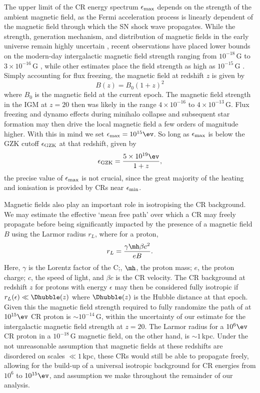 The upper limit of the CR energy spectrum $\epsilon_{\rm max}$ depends on the strength of the ambient magnetic field, as the Fermi acceleration process is linearly dependent of the magnetic field through which the SN shock wave propagates. While the strength, generation mechanism, and distribution of magnetic fields in the early universe remain highly uncertain \citep{DurrerNeronov2013}, recent observations have placed lower bounds on the modern-day intergalactic magnetic field strength ranging from $10^{-18}\,$G \citep{Dermeretal2011} to $3\times10^{-16}\,$G \citep{NeronovVovk2010}, while other estimates place the field strength as high as $10^{-15}\,$G \citep{AndroKusenko2010}.  Simply accounting for flux freezing, the magnetic field at redshift $z$ is given by
\begin{equation}
B(z) = B_0 (1+z)^2
\end{equation}
where $B_0$ is the magnetic field at the current epoch. The magnetic field strength in the IGM at $z=20$ then was likely in the range $4\times10^{-16}$ to $4\times10^{-13}\,$G.  Flux freezing and dynamo effects during minihalo collapse and subsequent star formation may then drive the local magnetic field a few orders of magnitude higher.  With this in mind we set $\epsilon_{\rm max} = 10^{15}\ev$.  So long as $\epsilon_{\rm max}$ is below the GZK cutoff $\epsilon_{\rm \small GZK}$ at that redshift, given by \citep{StacyBromm2007}
\begin{equation}
\epsilon_{\rm \small GZK} = \frac{5\times10^{19}\ev}{1+z},
\end{equation}
the precise value of $\epsilon_{\rm max}$ is not crucial, since the great majority of the heating and ionisation is provided by CRs near $\epsilon_{\rm min}$.

Magnetic fields also play an important role in isotropising the CR background.  We may estimate the effective `mean free path' over which a CR may freely propagate before being significantly impacted by the presence of a magnetic field $B$ using the Larmor radius $r_L$, where for a proton, 
\begin{equation}
r_L = \frac{\gamma \mh \beta c^2}{eB}.
\end{equation}
Here, $\gamma$ is the Lorentz factor of the C;, $\mh$, the proton mass; $e$, the proton charge; $c$, the speed of light, and $\beta c$ is the CR velocity. The CR background at redshift $z$ for protons with energy $\epsilon$ may then be considered fully isotropic if $r_L(\epsilon) \ll \Dhubble(z)$ where $\Dhubble(z)$ is the Hubble distance at that epoch. Given this the magnetic field strength required to fully randomize the path of at $10^{15}\ev$ CR proton is $\sim$$10^{-14}\,$G, within the uncertainty of our estimate for the intergalactic magnetic field strength at $z=20$.  The Larmor radius for a $10^6\ev$ CR proton in a $10^{-18}\,$G magnetic field, on the other hand, is $\sim$$1\,$kpc.  Under the not unreasonable assumption that magnetic fields at these redshifts are disordered on scales $\ll1\,$kpc, these CRs would still be able to propagate freely, allowing for the build-up of a universal isotropic background for CR energies from $10^6$ to $10^{15}\ev$, and assumption we make throughout the remainder of our analysis.


